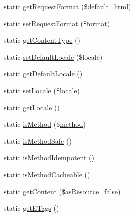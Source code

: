 \begin{DoxyCompactItemize}
static \mbox{\hyperlink{class_illuminate_1_1_support_1_1_facades_1_1_request_ac2f5053668bc247ab6d042136cf3f048}{get\+Request\+Format}} (\$default=\textquotesingle{}html\textquotesingle{})
\item 
static \mbox{\hyperlink{class_illuminate_1_1_support_1_1_facades_1_1_request_aaf9cb930a254f206113925d932c18b45}{set\+Request\+Format}} (\$\mbox{\hyperlink{class_illuminate_1_1_support_1_1_facades_1_1_request_ac091887300694c2d2f8630bb15adc897}{format}})
\item 
static \mbox{\hyperlink{class_illuminate_1_1_support_1_1_facades_1_1_request_a0566566f7856c8b38d190298600a86e5}{get\+Content\+Type}} ()
\item 
static \mbox{\hyperlink{class_illuminate_1_1_support_1_1_facades_1_1_request_a934d94aebb334fe5d98af6dc7dad3097}{set\+Default\+Locale}} (\$locale)
\item 
static \mbox{\hyperlink{class_illuminate_1_1_support_1_1_facades_1_1_request_a5031981f11ab07f0bd8df4d4c5b98d0a}{get\+Default\+Locale}} ()
\item 
static \mbox{\hyperlink{class_illuminate_1_1_support_1_1_facades_1_1_request_a4b9373832b64d3e19dc3aa04c6109c73}{set\+Locale}} (\$locale)
\item 
static \mbox{\hyperlink{class_illuminate_1_1_support_1_1_facades_1_1_request_a8610853bbc9553703ceef4cf59b72cc5}{get\+Locale}} ()
\item 
static \mbox{\hyperlink{class_illuminate_1_1_support_1_1_facades_1_1_request_a3711d10d844d086b2cd27c7c7ed1d76f}{is\+Method}} (\$\mbox{\hyperlink{class_illuminate_1_1_support_1_1_facades_1_1_request_af4fe38392dfdd7f5daa7d2d811bad24d}{method}})
\item 
static \mbox{\hyperlink{class_illuminate_1_1_support_1_1_facades_1_1_request_ae5c61ec58eda5633dd221ae99b3521d3}{is\+Method\+Safe}} ()
\item 
static \mbox{\hyperlink{class_illuminate_1_1_support_1_1_facades_1_1_request_aab7b89683fe78e6fc1541949134ff4d1}{is\+Method\+Idempotent}} ()
\item 
static \mbox{\hyperlink{class_illuminate_1_1_support_1_1_facades_1_1_request_a12a20ca1818c7c5ee617bb5ebeba3848}{is\+Method\+Cacheable}} ()
\item 
static \mbox{\hyperlink{class_illuminate_1_1_support_1_1_facades_1_1_request_a1b836840a59e484da9ceaf51a92605de}{get\+Content}} (\$as\+Resource=false)
\item 
static \mbox{\hyperlink{class_illuminate_1_1_support_1_1_facades_1_1_request_a68234b90eb6e13199e8d88b92c249cc3}{get\+E\+Tags}} ()

\end{DoxyCompactItemize}
